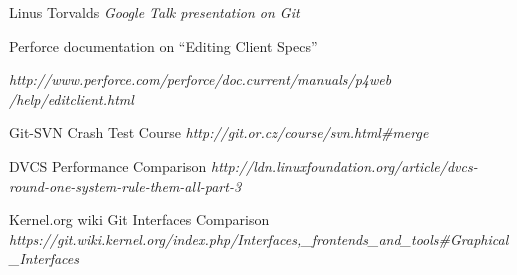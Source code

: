 \begin{thebibliography}{9}

Linus Torvalds
\newblock \emph{Google Talk presentation on Git}

Perforce documentation on ``Editing Client Specs''

\newblock \emph{
http://www.perforce.com/perforce/doc.current/manuals/p4web
/help/editclient.html
}

Git-SVN Crash Test Course
\newblock \emph{http://git.or.cz/course/svn.html\#merge}

DVCS Performance Comparison
\newblock \emph{http://ldn.linuxfoundation.org/article/dvcs-round-one-system-rule-them-all-part-3}

Kernel.org wiki Git Interfaces Comparison
\newblock \emph{https://git.wiki.kernel.org/index.php/Interfaces,\_frontends\_and\_tools\#Graphical\_Interfaces}

% 
% 
% 
% 
\end{thebibliography}


